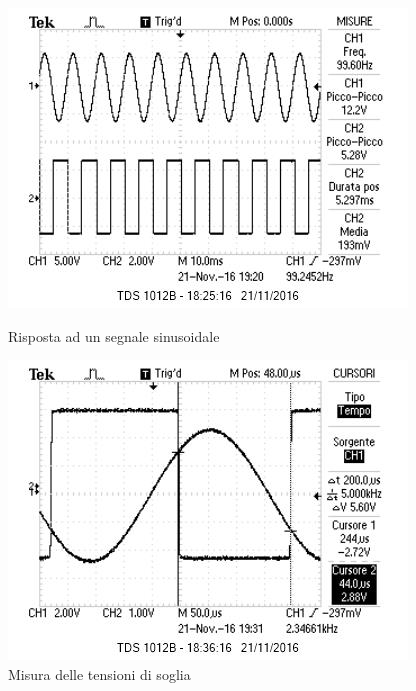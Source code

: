 \documentclass[10pt,a4paper]{article}
\begin{document}
\begin{figure}[H]
    \centering
    \begin{minipage}{0.49\textwidth}
	    \includegraphics[width=\textwidth]{../oscilloscopio/schmitt.jpg}
	    \caption{Risposta ad un segnale sinusoidale}
	    \label{fig:schmitt}
    \end{minipage}
    \begin{minipage}{0.49\textwidth}
        \includegraphics[width=\textwidth]{../oscilloscopio/schmitt_soglia.jpg}
        \caption{Misura delle tensioni di soglia}
        \label{fig:schmitt_soglia}
    \end{minipage}
\end{figure}
\end{document}

